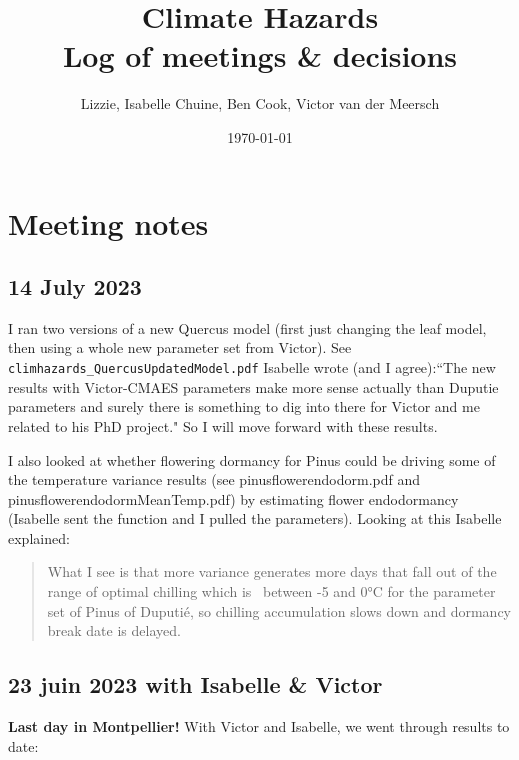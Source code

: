 \documentclass[11pt,letter]{article}
\begin{document}

\renewcommand{\refname}{\CHead{}}

\title{Climate Hazards \\ Log of meetings \& decisions}
\author{Lizzie, Isabelle Chuine, Ben Cook, Victor van der Meersch}
\date{\today}
\maketitle
\tableofcontents


\section{Meeting notes}

\subsection{14 July 2023}
I ran two versions of a new Quercus model (first just changing the leaf model, then using a whole new parameter set from Victor). See \verb|climhazards_QuercusUpdatedModel.pdf| Isabelle wrote (and I agree):``The new results with Victor-CMAES parameters make more sense actually than Duputie parameters and surely there is something to dig into there for Victor and me related to his PhD project." So I will move forward with these results. 

I also looked at whether flowering dormancy for Pinus could be driving some of the temperature variance results (see pinusflowerendodorm.pdf and pinusflowerendodormMeanTemp.pdf) by estimating flower endodormancy (Isabelle sent the function and I pulled the parameters). Looking at this Isabelle explained:

\begin{quote}
What I see is that more variance generates more days that fall out of the range of optimal chilling which is ~between -5 and 0°C for the parameter set of Pinus of Duputié, so chilling accumulation slows down and dormancy break date is delayed. 
\end{quote}


\subsection{23 juin 2023 with Isabelle \& Victor}
{\bf Last day in Montpellier!} With Victor and Isabelle, we went through results to date:
\end{document}
